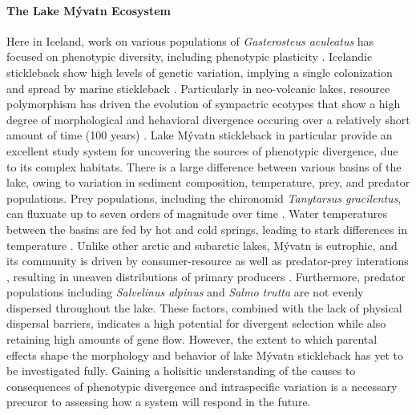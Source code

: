 \documentclass[12pt]{extarticle}
\begin{document}
\paragraph{The Lake M\'yvatn Ecosystem}
Here in Iceland, work on various populations of \textit{Gasterosteus aculeatus} has focused on phenotypic diversity, including phenotypic plasticity \citep{Kristjansson2002, Millet2013}. Icelandic stickleback show high levels of genetic variation, implying a single colonization and spread by marine stickleback \citep{Olafsdottir2007}. Particularly in neo-volcanic lakes, resource polymorphism has driven the evolution of sympactric ecotypes \citep{Olafsdottir2007, Kristjansson2002} that show a high degree of morphological and hehavioral divergence occuring over a relatively short amount of time (100 years) \citep{Lucek2014}. Lake M\'yvatn stickleback in particular provide an excellent study system for uncovering the sources of phenotypic divergence, due to its complex habitats. There is a large difference between various basins of the lake, owing to variation in sediment composition, temperature, prey, and predator populations. Prey populations, including the chironomid \textit{Tanytarsus gracilentus}, can fluxuate up to seven orders of magnitude over time \citep{Bartrons2018}.  Water temperatures between the basins are fed by hot and cold springs, leading to stark differences in temperature \citep{Einarsson2004}. Unlike other arctic and subarctic lakes, M\'yvatn is eutrophic, and its community is driven by consumer-resource as well as predator-prey interations \citep{Bartrons2018}, resulting in uneaven distributions of primary producers \citep{Einarsson2004}. Furthermore, predator populations including \textit{Salvelinus alpinus} and \textit{Salmo trutta} are not evenly dispersed throughout the lake. These factors, combined with the lack of physical dispersal barriers, indicates a high potential for divergent selection while also retaining high amounts of gene flow. However, the extent to which parental effects shape the morphology and behavior of lake M\'yvatn stickleback has yet to be investigated fully. Gaining a holisitic understanding of the causes to consequences of phenotypic divergence and intraspecific variation is a necessary precuror to assessing how a system will respond in the future.
\end{document}
